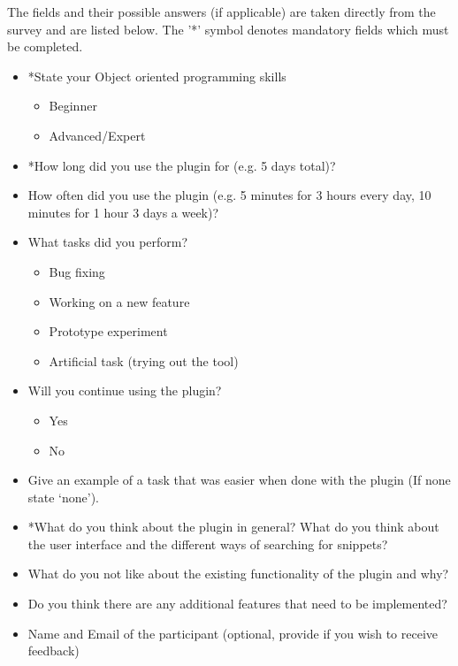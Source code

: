 \documentclass{l4proj}
\begin{document}
The fields and their possible answers (if applicable) are taken directly from the survey and are listed below. The '*' symbol denotes mandatory fields which must be completed.

\begin{itemize}
\item *State your Object oriented programming skills
\begin{itemize}
\item Beginner
\item Advanced/Expert
\end{itemize}

\item *How long did you use the plugin for (e.g. 5 days total)?

\item How often did you use the plugin (e.g. 5 minutes for 3 hours every day, 10 minutes for 1 hour 3 days a week)?

\item What tasks did you perform?
\begin{itemize}
\item Bug fixing
\item Working on a new feature
\item Prototype experiment
\item Artificial task (trying out the tool)
\end{itemize}

\item Will you continue using the plugin?
\begin{itemize}
\item Yes
\item No
\end{itemize}

\item Give an example of a task that was easier when done with the plugin (If none state ‘none’).

\item *What do you think about the plugin in general? What do you think about the user interface and the different ways of searching for snippets?

\item What do you not like about the existing functionality of the plugin and why?

\item Do you think there are any additional features that need to be implemented?

\item Name and Email of the participant (optional, provide if you wish to receive feedback)
\end{itemize}
\end{document}
